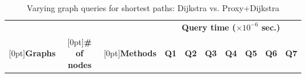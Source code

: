 \begin{table}[t!]
\caption{Varying graph queries for shortest paths: Dijkstra  vs. Proxy+Dijkstra}\label{tab:performance_path_queries_dj}
\vspace{-2ex}
\begin{center}
\begin{scriptsize}


\begin{tabular}{|c|c|c||r|r|r|r|r|r|r|}
\hline
  & &   & \multicolumn{7}{c|}{\bf Query time ($\times 10^{-6}$ sec.)} \\
\cline{4-10}

\raisebox{1.5ex}[0pt]{\bf Graphs}&\raisebox{1.5ex}[0pt]{\bf \# of nodes} & \raisebox{1.5ex}[0pt]{\bf Methods} & {\bf Q1} & {\bf Q2} & {\bf Q3} & {\bf Q4} & {\bf Q5} & {\bf Q6} & {\bf Q7}  \\ \hline \hline


\end{tabular}
\end{scriptsize}
\end{center}
\end{table}

